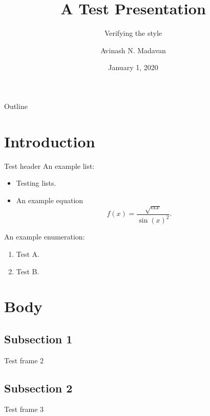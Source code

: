 \documentclass[11pt]{beamer}
\title{A Test Presentation}
\subtitle{Verifying the style}
\author[A. N. Madavan]{Avinash N. Madavan}
\institute[UIUC]{Univeristy of Illinois, Urbana-Champaign}
\date{January 1, 2020}
\begin{document}
\frame{\titlepage}

\begin{frame}{Outline}
  \tableofcontents
\end{frame}

\section{Introduction} %
\label{sec:introduction}

\begin{frame}{Test header}
  An example list:
  \begin{itemize}
    \item Testing lists.
    \item An example equation
    \begin{equation*}
      f(x) = \frac{\sqrt{\alpha x}}{\sin(x)^2}.
    \end{equation*}
  \end{itemize}

  An example enumeration:
  \begin{enumerate}
    \item Test A.
    \item Test B.
  \end{enumerate}
\end{frame}


\section{Body} %
\label{sec:body}

\subsection{Subsection 1} %
\label{sub:subsection_1}

\begin{frame}{Test frame 2}
  
\end{frame}


\subsection{Subsection 2} %
\label{sub:subsection_2}

\begin{frame}{Test frame 3}
  
\end{frame}
\end{document}
